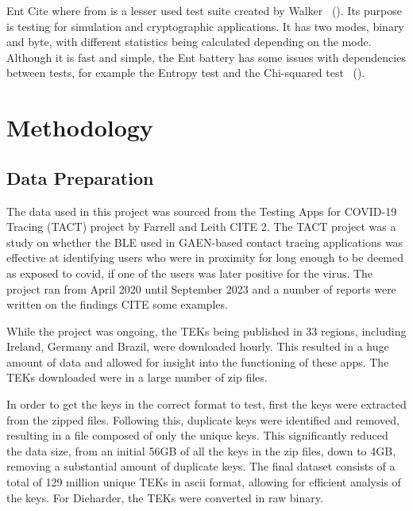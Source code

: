 Ent Cite where from is a lesser used test suite created by Walker ~(\cite{10.1145/3447773}). Its purpose is testing for simulation and cryptographic applications. It has two modes, binary and byte, with different statistics being calculated depending on the mode. Although it is fast and simple, the Ent battery has some issues with dependencies between tests, for example the Entropy test and the Chi-squared test ~(\cite{10.1145/3447773}). 


\section{Methodology}

\subsection{Data Preparation}

The data used in this project was sourced from the Testing Apps for COVID-19 Tracing (TACT) project by Farrell and Leith CITE 2. The TACT project was a study on whether the BLE used in GAEN-based contact tracing applications was effective at identifying users who were in proximity for long enough to be deemed as exposed to covid, if one of the users was later positive for the virus. The project ran from April 2020 until September 2023 and a number of reports were written on the findings CITE some examples. \newline

While the project was ongoing, the TEKs being published in 33 regions, including Ireland, Germany and Brazil, were downloaded hourly. This resulted in a huge amount of data and allowed for insight into the functioning of these apps. The TEKs downloaded were in a large number of zip files. \newline

In order to get the keys in the correct format to test, first the keys were extracted from the zipped files. Following this, duplicate keys were identified and removed, resulting in a file composed  of only the unique keys. This significantly reduced the data size, from an initial 56GB of all the keys in the zip files, down to 4GB, removing a substantial amount of duplicate keys. The final dataset consists of a total of 129 million unique TEKs in ascii format, allowing for efficient analysis of the keys. For Dieharder, the TEKs were converted in raw binary.

